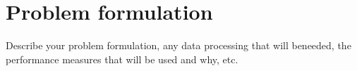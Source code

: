 \section{Problem  formulation}
\label{sec:problem}

Describe  your  problem  formulation,  any  data  processing  that  
will  beneeded, the performance measures that will be used and why, 
etc.

